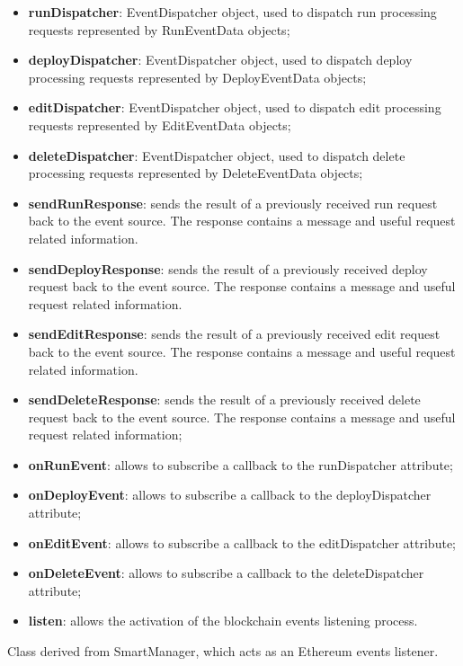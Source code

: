 	\begin{itemize}
		\item \textbf{runDispatcher}: EventDispatcher object, used to dispatch run processing requests represented by RunEventData objects;
		\item \textbf{deployDispatcher}: EventDispatcher object, used to dispatch deploy processing requests represented by DeployEventData objects;
		\item \textbf{editDispatcher}: EventDispatcher object, used to dispatch edit processing requests represented by EditEventData objects;
		\item \textbf{deleteDispatcher}: EventDispatcher object, used to dispatch delete processing requests represented by DeleteEventData objects;
	\end{itemize}
	\begin{itemize}
		\item \textbf{sendRunResponse}: sends the result of a previously received run request back to the event source. The response contains a message and useful request related information.
		\item \textbf{sendDeployResponse}: sends the result of a previously received deploy request back to the event source. The response contains a message and useful request related information.
		\item \textbf{sendEditResponse}: sends the result of a previously received edit request back to the event source. The response contains a message and useful request related information.
		\item \textbf{sendDeleteResponse}: sends the result of a previously received delete request back to the event source. The response contains a message and useful request related information;
		\item \textbf{onRunEvent}: allows to subscribe a callback to the runDispatcher attribute;
		\item \textbf{onDeployEvent}: allows to subscribe a callback to the deployDispatcher attribute;
		\item \textbf{onEditEvent}: allows to subscribe a callback to the editDispatcher attribute;
		\item \textbf{onDeleteEvent}: allows to subscribe a callback to the deleteDispatcher attribute;
		\item \textbf{listen}: allows the activation of the blockchain events listening process.
	\end{itemize}
	Class derived from SmartManager, which acts as an Ethereum events listener.
